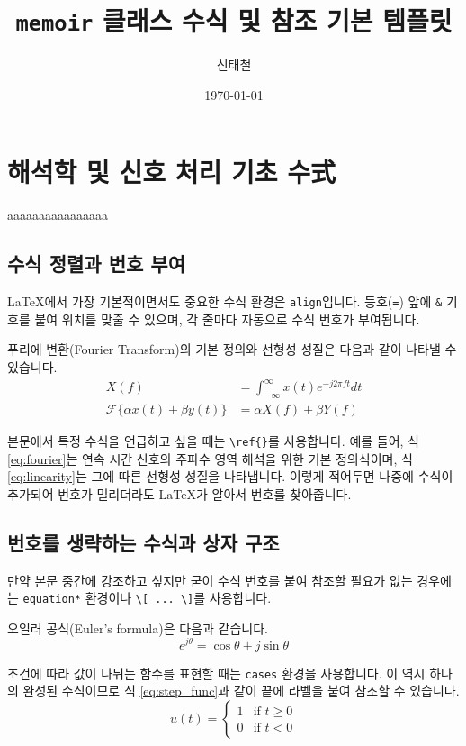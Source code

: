 \documentclass[12pt,a4paper,oneside]{memoir}
\title{\texttt{memoir} 클래스 수식 및 참조 기본 템플릿}
\author{신태철}
\date{\today}
\begin{document}
\maketitle

\tableofcontents
\newpage

\chapter{해석학 및 신호 처리 기초 수式}
aaaaaaaaaaaaaaaa
\section{수식 정렬과 번호 부여}
LaTeX에서 가장 기본적이면서도 중요한 수식 환경은 \texttt{align}입니다. 등호(\texttt{=}) 앞에 \texttt{\&} 기호를 붙여 위치를 맞출 수 있으며, 각 줄마다 자동으로 수식 번호가 부여됩니다.

푸리에 변환(Fourier Transform)의 기본 정의와 선형성 성질은 다음과 같이 나타낼 수 있습니다.
\begin{align}
    X(f) &= \int_{-\infty}^{\infty} x(t) e^{-j 2\pi f t} dt \label{eq:fourier} \\
    \mathcal{F}\{\alpha x(t) + \beta y(t)\} &= \alpha X(f) + \beta Y(f) \label{eq:linearity}
\end{align}

본문에서 특정 수식을 언급하고 싶을 때는 \texttt{\textbackslash ref\{\}}를 사용합니다. 예를 들어, 식 \ref{eq:fourier}는 연속 시간 신호의 주파수 영역 해석을 위한 기본 정의식이며, 식 \ref{eq:linearity}는 그에 따른 선형성 성질을 나타냅니다. 이렇게 적어두면 나중에 수식이 추가되어 번호가 밀리더라도 LaTeX가 알아서 번호를 찾아줍니다.


\section{번호를 생략하는 수식과 상자 구조}
만약 본문 중간에 강조하고 싶지만 굳이 수식 번호를 붙여 참조할 필요가 없는 경우에는 \texttt{equation*} 환경이나 \texttt{\textbackslash[ ... \textbackslash]}를 사용합니다.

오일러 공식(Euler's formula)은 다음과 같습니다.
\[
    e^{j\theta} = \cos\theta + j\sin\theta
\]

조건에 따라 값이 나뉘는 함수를 표현할 때는 \texttt{cases} 환경을 사용합니다. 이 역시 하나의 완성된 수식이므로 식 \ref{eq:step_func}과 같이 끝에 라벨을 붙여 참조할 수 있습니다.
\begin{equation}
    u(t) = \begin{cases}
        1 & \text{if } t \ge 0 \\
        0 & \text{if } t < 0
    \end{cases} \label{eq:step_func}
\end{equation}
\end{document}
